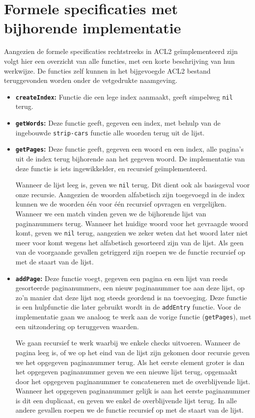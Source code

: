 \section{Formele specificaties met bijhorende implementatie}
Aangezien de formele specificaties rechtstreeks in ACL2 geïmplementeerd zijn volgt hier een overzicht van alle functies, met een korte beschrijving van hun werkwijze. De functies zelf kunnen in het bijgevoegde ACL2 bestand teruggevonden worden onder de vetgedrukte naamgeving.

\begin{itemize}
\item \textbf{\texttt{createIndex}:} Functie die een lege index aanmaakt, geeft simpelweg \texttt{nil} terug.

\item \textbf{\texttt{getWords}:} Deze functie geeft, gegeven een index, met behulp van de ingebouwde \texttt{strip-cars} functie alle woorden terug uit de lijst.

\item \textbf{\texttt{getPages}:} Deze functie geeft, gegeven een woord en een index, alle pagina's uit de index terug bijhorende aan het gegeven woord. De implementatie van deze functie is iets ingewikkelder, en recursief geïmplementeerd.

Wanneer de lijst leeg is, geven we \texttt{nil} terug. Dit dient ook als basisgeval voor onze recursie. Aangezien de woorden alfabetisch zijn toegevoegd in de index kunnen we de woorden één voor één recursief opvragen en vergelijken. Wanneer we een match vinden geven we de bijhorende lijst van paginanummers terug. Wanneer het huidige woord voor het gevraagde woord komt, geven we \texttt{nil} terug, aangezien we zeker weten dat het woord later niet meer voor komt wegens het alfabetisch gesorteerd zijn van de lijst. Als geen van de voorgaande gevallen getriggerd zijn roepen we de functie recursief op met de staart van de lijst.

\item \textbf{\texttt{addPage}:} Deze functie voegt, gegeven een pagina en een lijst van reeds gesorteerde paginanummers, een nieuw paginanummer toe aan deze lijst, op zo'n manier dat deze lijst nog steeds geordend is na toevoeging. Deze functie is een hulpfunctie die later gebruikt wordt in de \texttt{addEntry} functie. Voor de implementatie gaan we analoog te werk aan de vorige functie (\texttt{getPages}), met een uitzondering op teruggeven waarden.

We gaan recursief te werk waarbij we enkele checks uitvoeren. Wanneer de pagina leeg is, of we op het eind van de lijst zijn gekomen door recursie geven we het opgegeven paginanummer terug. Als het eerste element groter is dan het opgegeven paginanummer geven we een nieuwe lijst terug, opgemaakt door het opgegeven paginanummer te concateneren met de overblijvende lijst. Wanneer het opgegeven paginanummer gelijk is aan het eerste paginanummer is dit een duplicaat, en geven we enkel de overblijvende lijst terug. In alle andere gevallen roepen we de functie recursief op met de staart van de lijst.


\end{itemize}
